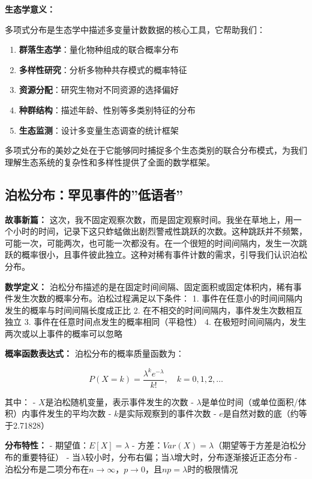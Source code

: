 \documentclass[
  twoside]{book}
\providecommand{\tightlist}{%
  \setlength{\itemsep}{0pt}\setlength{\parskip}{0pt}}
\begin{document}
\textbf{生态学意义：}

多项式分布是生态学中描述多变量计数数据的核心工具，它帮助我们：

\begin{enumerate}
\def\labelenumi{\arabic{enumi}.}
\tightlist
\item
  \textbf{群落生态学}：量化物种组成的联合概率分布
\item
  \textbf{多样性研究}：分析多物种共存模式的概率特征
\item
  \textbf{资源分配}：研究生物对不同资源的选择偏好
\item
  \textbf{种群结构}：描述年龄、性别等多类别特征的分布
\item
  \textbf{生态监测}：设计多变量生态调查的统计框架
\end{enumerate}

多项式分布的美妙之处在于它能够同时捕捉多个生态类别的联合分布模式，为我们理解生态系统的复杂性和多样性提供了全面的数学框架。

\hypertarget{ux6ccaux677eux5206ux5e03ux7f55ux89c1ux4e8bux4ef6ux7684ux4f4eux8bedux8005}{%
\subsection{泊松分布：罕见事件的''低语者''}\label{ux6ccaux677eux5206ux5e03ux7f55ux89c1ux4e8bux4ef6ux7684ux4f4eux8bedux8005}}

\textbf{故事新篇：} 这次，我不固定观察次数，而是固定观察时间。我坐在草地上，用一个小时的时间，记录下这只蚱蜢做出剧烈警戒性跳跃的次数。这种跳跃并不频繁，可能一次，可能两次，也可能一次都没有。在一个很短的时间间隔内，发生一次跳跃的概率很小，且事件彼此独立。这种对稀有事件计数的需求，引导我们认识泊松分布。

\textbf{数学定义：} 泊松分布描述的是在固定时间间隔、固定面积或固定体积内，稀有事件发生次数的概率分布。泊松过程满足以下条件：
1. 事件在任意小的时间间隔内发生的概率与时间间隔长度成正比
2. 在不相交的时间间隔内，事件发生次数相互独立
3. 事件在任意时间点发生的概率相同（平稳性）
4. 在极短时间间隔内，发生两次或以上事件的概率可以忽略

\textbf{概率函数表达式：} 泊松分布的概率质量函数为：

\[P(X = k) = \frac{\lambda^k e^{-\lambda}}{k!}, \quad k = 0, 1, 2, \ldots\]

其中：
- \(X\)是泊松随机变量，表示事件发生的次数
- \(\lambda\)是单位时间（或单位面积/体积）内事件发生的平均次数
- \(k\)是实际观察到的事件次数
- \(e\)是自然对数的底（约等于2.71828）

\textbf{分布特性：}
- 期望值：\(E[X] = \lambda\)
- 方差：\(Var(X) = \lambda\)（期望等于方差是泊松分布的重要特征）
- 当\(\lambda\)较小时，分布右偏；当\(\lambda\)增大时，分布逐渐接近正态分布
- 泊松分布是二项分布在\(n \to \infty\)，\(p \to 0\)，且\(np = \lambda\)时的极限情况
\end{document}

